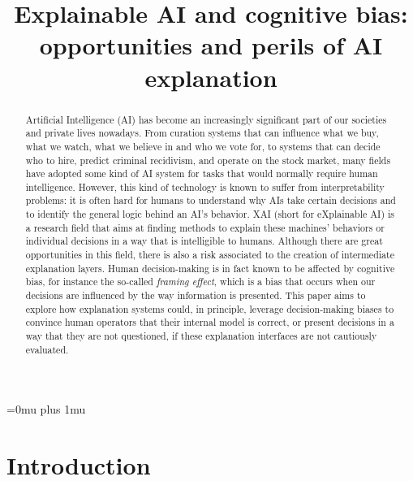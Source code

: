 \documentclass[conference]{IEEEtran}
\begin{document}
\Urlmuskip=0mu plus 1mu

\title{Explainable AI and cognitive bias: opportunities and perils of AI explanation}


\author{
    }

\maketitle

\begin{abstract}
    Artificial Intelligence (AI) has become an increasingly significant part of
    our societies and private lives nowadays. From curation systems that can
    influence what we buy, what we watch, what we believe in and who we vote
    for, to systems that can decide who to hire, predict criminal recidivism,
    and operate on the stock market, many fields have adopted some kind of AI
    system for tasks that would normally require human intelligence. However,
    this kind of technology is known to suffer from interpretability problems:
    it is often hard for humans to understand why AIs take certain decisions and to identify the general logic behind an AI's
    behavior. XAI (short for eXplainable AI) is a research field that aims at
    finding methods to explain these machines' behaviors or individual decisions
    in a way that is intelligible to humans. Although there are great
    opportunities in this field, there is also a risk associated to the creation
    of intermediate explanation layers. Human decision-making is in fact known
    to be affected by cognitive bias, for instance the so-called \textit{framing
        effect}, which is a bias that occurs when our decisions are influenced by the way
    information is presented. This paper aims to explore how explanation
    systems could, in principle, leverage decision-making biases to convince
    human operators that their internal model is correct, or present decisions
    in a way that they are not questioned, if these explanation interfaces are
    not cautiously evaluated.
\end{abstract}

\section{Introduction}
\label{sec:intro}
\end{document}
